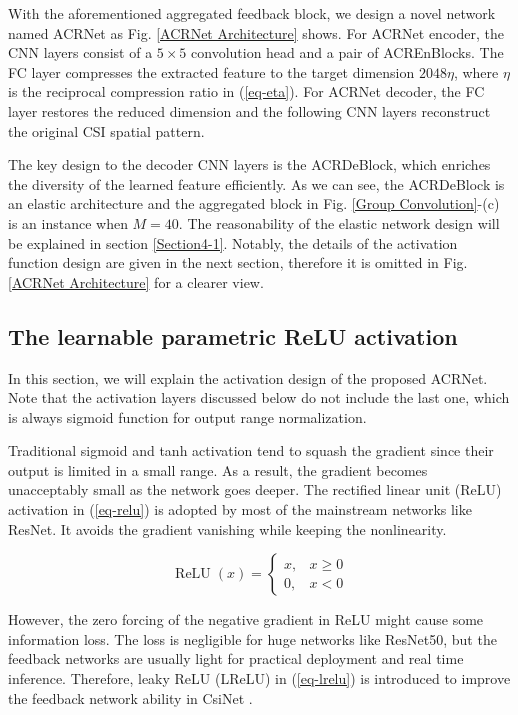 \documentclass[12pt, draftclsnofoot, onecolumn]{IEEEtran}
\DeclareMathOperator*{\ReLU}{ReLU}
\begin{document}
With the aforementioned aggregated feedback block, we design a novel network named ACRNet as Fig. \ref{ACRNet Architecture} shows. For ACRNet encoder, the CNN layers consist of a $5\times 5$ convolution head and a pair of ACREnBlocks. The FC layer compresses the extracted feature to the target dimension $2048\eta$, where $\eta$ is the reciprocal compression ratio in (\ref{eq-eta}). For ACRNet decoder, the FC layer restores the reduced dimension and the following CNN layers reconstruct the original CSI spatial pattern.

The key design to the decoder CNN layers is the ACRDeBlock, which enriches the diversity of the learned feature efficiently. As we can see, the ACRDeBlock is an elastic architecture and the aggregated block in Fig. \ref{Group Convolution}-(c) is an instance when $M=40$. The reasonability of the elastic network design will be explained in section \ref{Section4-1}. Notably, the details of the activation function design are given in the next section, therefore it is omitted in Fig. \ref{ACRNet Architecture} for a clearer view.

\subsection{The learnable parametric ReLU activation} \label{Section3-2}

In this section, we will explain the activation design of the proposed ACRNet. Note that the activation layers discussed below do not include the last one, which is always sigmoid function for output range normalization.

Traditional sigmoid and tanh activation tend to squash the gradient since their output is limited in a small range. As a result, the gradient becomes unacceptably small as the network goes deeper. The rectified linear unit (ReLU) activation in (\ref{eq-relu}) is adopted by most of the mainstream networks like ResNet. It avoids the gradient vanishing while keeping the nonlinearity.

\begin{equation} \label{eq-relu}
	\ReLU(x) = \left\{
		\begin{array}{ll}
			x, & x \ge 0 \\
			0, & x < 0
		\end{array}
	\right.
\end{equation}

However, the zero forcing of the negative gradient in ReLU might cause some information loss. The loss is negligible for huge networks like ResNet50, but the feedback networks are usually light for practical deployment and real time inference. Therefore, leaky ReLU (LReLU) in (\ref{eq-lrelu}) is introduced to improve the feedback network ability in CsiNet \cite{wen2018deep}.
\end{document}

